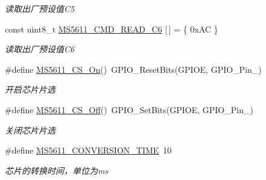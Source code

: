 \begin{DoxyCompactItemize}
\begin{DoxyCompactList}\small\item\em 读取出厂预设值\+C5 \end{DoxyCompactList}\item 
const uint8\+\_\+t \hyperlink{group__ms5611__driver__internal_ga27544c59b693ee1160b49dd80577fedb}{M\+S5611\+\_\+\+C\+M\+D\+\_\+\+R\+E\+A\+D\+\_\+\+C6} \mbox{[}$\,$\mbox{]} = \{ 0x\+A\+C \}\hypertarget{group__ms5611__driver__internal_ga27544c59b693ee1160b49dd80577fedb}{}\label{group__ms5611__driver__internal_ga27544c59b693ee1160b49dd80577fedb}

\begin{DoxyCompactList}\small\item\em 读取出厂预设值\+C6 \end{DoxyCompactList}\item 
\#define \hyperlink{group__ms5611__driver__internal_ga290d6db5c529c90aa2dc855623f55b78}{M\+S5611\+\_\+\+C\+S\+\_\+\+On}()~G\+P\+I\+O\+\_\+\+Reset\+Bits(G\+P\+I\+OE, G\+P\+I\+O\+\_\+\+Pin\+\_)\hypertarget{group__ms5611__driver__internal_ga290d6db5c529c90aa2dc855623f55b78}{}\label{group__ms5611__driver__internal_ga290d6db5c529c90aa2dc855623f55b78}

\begin{DoxyCompactList}\small\item\em 开启芯片片选 \end{DoxyCompactList}\item 
\#define \hyperlink{group__ms5611__driver__internal_ga132d44bdafc80a7ef5259734dc4547c2}{M\+S5611\+\_\+\+C\+S\+\_\+\+Off}()~G\+P\+I\+O\+\_\+\+Set\+Bits(G\+P\+I\+OE, G\+P\+I\+O\+\_\+\+Pin\+\_)\hypertarget{group__ms5611__driver__internal_ga132d44bdafc80a7ef5259734dc4547c2}{}\label{group__ms5611__driver__internal_ga132d44bdafc80a7ef5259734dc4547c2}

\begin{DoxyCompactList}\small\item\em 关闭芯片片选 \end{DoxyCompactList}\item 
\#define \hyperlink{group__ms5611__driver__internal_gabae8b9d1a17f48b416cc3881bb954ca2}{M\+S5611\+\_\+\+C\+O\+N\+V\+E\+R\+S\+I\+O\+N\+\_\+\+T\+I\+ME}~10\hypertarget{group__ms5611__driver__internal_gabae8b9d1a17f48b416cc3881bb954ca2}{}\label{group__ms5611__driver__internal_gabae8b9d1a17f48b416cc3881bb954ca2}

\begin{DoxyCompactList}\small\item\em 芯片的转换时间，单位为ms \end{DoxyCompactList}\end{DoxyCompactItemize}


